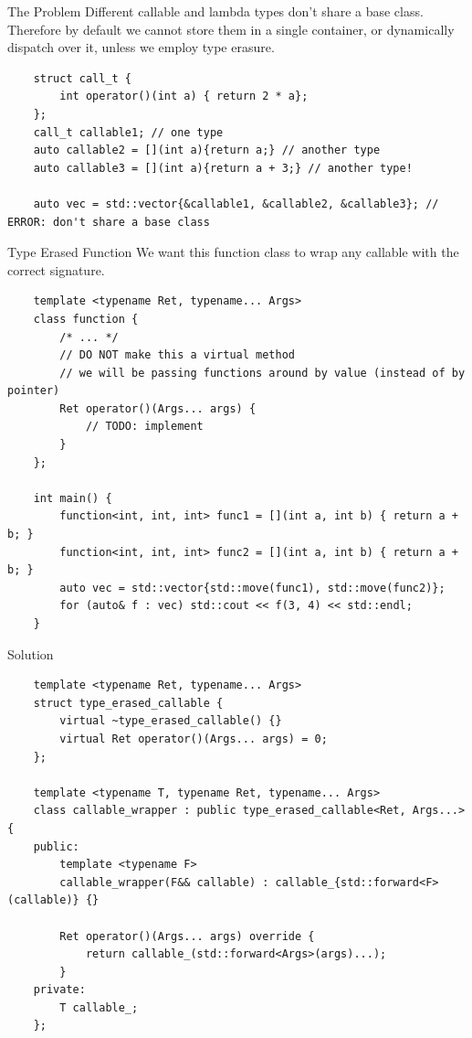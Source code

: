 \begin{frame}[fragile]{The Problem}
  Different callable and lambda types don't share a base class.
  Therefore by default we cannot store them in a single container, or 
  dynamically dispatch over it, unless we employ type erasure.
  \begin{verbatim}
    struct call_t {
        int operator()(int a) { return 2 * a};
    };
    call_t callable1; // one type
    auto callable2 = [](int a){return a;} // another type
    auto callable3 = [](int a){return a + 3;} // another type!

    auto vec = std::vector{&callable1, &callable2, &callable3}; // ERROR: don't share a base class
  \end{verbatim}
\end{frame}

\begin{frame}[fragile]{Type Erased Function}
  We want this function class to wrap any callable with the correct signature.
  \begin{verbatim}
    template <typename Ret, typename... Args>
    class function {
        /* ... */
        // DO NOT make this a virtual method
        // we will be passing functions around by value (instead of by pointer)
        Ret operator()(Args... args) {
            // TODO: implement
        }
    };

    int main() {
        function<int, int, int> func1 = [](int a, int b) { return a + b; }
        function<int, int, int> func2 = [](int a, int b) { return a + b; }
        auto vec = std::vector{std::move(func1), std::move(func2)};
        for (auto& f : vec) std::cout << f(3, 4) << std::endl;
    }
  \end{verbatim}
\end{frame}

\begin{frame}[fragile]{Solution}
  \begin{verbatim}
    template <typename Ret, typename... Args>
    struct type_erased_callable {
        virtual ~type_erased_callable() {}
        virtual Ret operator()(Args... args) = 0;
    };

    template <typename T, typename Ret, typename... Args>
    class callable_wrapper : public type_erased_callable<Ret, Args...> {
    public:
        template <typename F>
        callable_wrapper(F&& callable) : callable_{std::forward<F>(callable)} {}

        Ret operator()(Args... args) override {
            return callable_(std::forward<Args>(args)...);
        }
    private:
        T callable_;
    };
  \end{verbatim}
\end{frame}

